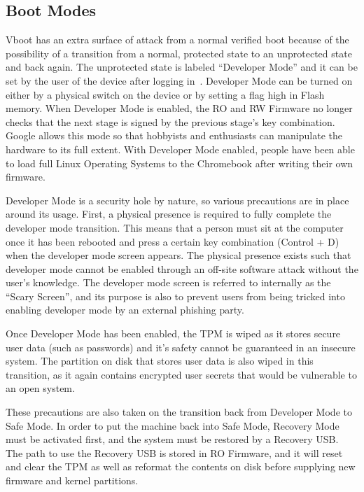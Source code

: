 \documentclass[../report.tex]{subfiles}
\begin{document}
\subsection{Boot Modes} \label{sec:boot-modes}

Vboot has an extra surface of attack from a normal verified boot because of the possibility of a transition from a normal, protected state to an unprotected state and back again.
The unprotected state is labeled ``Developer Mode'' and it can be set by the user of the device after logging in~\cite{developer-mode}. 
Developer Mode can be turned on either by a physical switch on the device or by setting a flag high in Flash memory.
When Developer Mode is enabled, the RO and RW Firmware no longer checks that the next stage is signed by the previous stage's key combination.
Google allows this mode so that hobbyists and enthusiasts can manipulate the hardware to its full extent.
With Developer Mode enabled, people have been able to load full Linux Operating Systems to the Chromebook after writing their own firmware.

Developer Mode is a security hole by nature, so various precautions are in place around its usage. 
First, a physical presence is required to fully complete the developer mode transition. 
This means that a person must sit at the computer once it has been rebooted and press a certain key combination (Control + D) when the developer mode screen appears.
The physical presence exists such that developer mode cannot be enabled through an off-site software attack without the user's knowledge.
The developer mode screen is referred to internally as the ``Scary Screen'', and its purpose is also to prevent users from being tricked into enabling developer mode by an external phishing party.

Once Developer Mode has been enabled, the TPM is wiped as it stores secure user data (such as passwords) and it's safety cannot be guaranteed in an insecure system.
The partition on disk that stores user data is also wiped in this transition, as it again contains encrypted user secrets that would be vulnerable to an open system.

These precautions are also taken on the transition back from Developer Mode to Safe Mode. 
In order to put the machine back into Safe Mode, Recovery Mode must be activated first, and the system must be restored by a Recovery USB\@.
The path to use the Recovery USB is stored in RO Firmware, and it will reset and clear the TPM as well as reformat the contents on disk before supplying new firmware and kernel partitions. 
\end{document}

